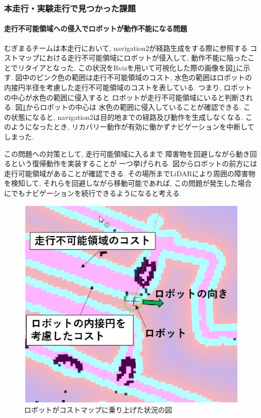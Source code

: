 \subsubsection{本走行・実験走行で見つかった課題}
\paragraph{走行不可能領域への侵入でロボットが動作不能になる問題}
むぎまるチームは本走行において, navigation2が経路生成をする際に参照する
コストマップにおける走行不可能領域にロボットが侵入して, 
動作不能に陥ったことでリタイアとなった. 
この状況をRvizを用いて可視化した際の画像を図\ref{fig:mugimaru_result}に示す. 
図中のピンク色の範囲は走行不可能領域のコスト, 
水色の範囲はロボットの内接円半径を考慮した走行不可能領域のコストを表している. 
つまり, ロボットの中心が水色の範囲に侵入すると
ロボットが走行不可能領域にいると判断される. 
図\ref{fig:mugimaru_result}からロボットの中心は
水色の範囲に侵入していることが確認できる. 
この状態になると, navigation2は目的地までの経路及び動作を生成しなくなる. 
このようになったとき, リカバリー動作が有効に働かずナビゲーションを中断してしまった. 

この問題への対策として, 走行可能領域に入るまで
障害物を回避しながら動き回るという復帰動作を実装することが
一つ挙げられる. 
図からロボットの前方には走行可能領域があることが確認できる. 
その場所までLiDARにより周囲の障害物を検知して, 
それらを回避しながら移動可能であれば, 
この問題が発生した場合にでもナビゲーションを続行できるようになると考える. 
\begin{figure}[h]
  \begin{center}
  	\includegraphics[width=0.9\linewidth]{figs/mugimaru_result.eps}
  	\caption{ロボットがコストマップに乗り上げた状況の図} 
  	\label{fig:mugimaru_result}
  \end{center}
\end{figure}

